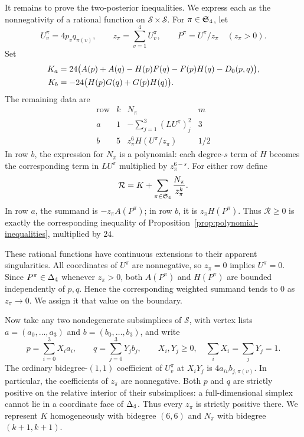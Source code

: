 It remains to prove the two-posterior inequalities. We express each
as the nonnegativity of a rational function on
$\mathcal S\times\mathcal S$. For $\pi\in\mathfrak S_4$, let
\[
 U^\pi_v=4p_vq_{\pi(v)},\qquad
 z_\pi=\sum_{v=1}^4U^\pi_v,\qquad
 P^\pi=U^\pi/z_\pi\quad(z_\pi>0).
\]
Set
\begin{align}
 K_a&=24\bigl(A(p)+A(q)-H(p)F(q)-F(p)H(q)-D_0(p,q)\bigr),\notag\\
 K_b&=-24\bigl(H(p)G(q)+G(p)H(q)\bigr).
 \label{eq:rational-K}
\end{align}
The remaining data are
\begin{equation}
 \begin{array}{c|c|c|c}
  \text{row} & k & N_\pi & m\\ \hline
  a & 1 & -\displaystyle\sum_{j=1}^3(LU^\pi)_j^2 & 3\\[2mm]
  b & 5 & z_\pi^6H(U^\pi/z_\pi) & 1/2
 \end{array}
 \label{eq:rational-rows}
\end{equation}
In row $b$, the expression for $N_\pi$ is a polynomial: each
degree-$s$ term of $H$ becomes the corresponding term in $LU^\pi$
multiplied by $z_\pi^{6-s}$. For either row define
\begin{equation}
 \mathcal R=K+\sum_{\pi\in\mathfrak S_4}\frac{N_\pi}{z_\pi^k}.
 \label{eq:rational-target}
\end{equation}
In row $a$, the summand is $-z_\pi A(P^\pi)$; in row $b$, it is
$z_\pi H(P^\pi)$. Thus $\mathcal R\ge0$ is exactly the corresponding
inequality of Proposition~\ref{prop:polynomial-inequalities}, multiplied
by $24$.

These rational functions have continuous extensions to their apparent
singularities. All coordinates of $U^\pi$ are nonnegative, so
$z_\pi=0$ implies $U^\pi=0$. Since $P^\pi\in\Delta_4$ whenever
$z_\pi>0$, both $A(P^\pi)$ and $H(P^\pi)$ are bounded independently
of $p,q$. Hence the corresponding weighted summand tends to $0$ as
$z_\pi\to0$. We assign it that value on the boundary.

Now take any two nondegenerate subsimplices of $\mathcal S$, with
vertex lists $a=(a_0,\ldots,a_3)$ and $b=(b_0,\ldots,b_3)$, and write
\[
 p=\sum_{i=0}^3X_ia_i,\qquad q=\sum_{j=0}^3Y_jb_j,
 \qquad X_i,Y_j\ge0,\quad \sum_iX_i=\sum_jY_j=1.
\]
The ordinary bidegree-$(1,1)$ coefficient of $U^\pi_v$ at $X_iY_j$
is $4a_{iv}b_{j,\pi(v)}$. In particular, the coefficients of $z_\pi$
are nonnegative. Both $p$ and $q$ are strictly positive on the
relative interior of their subsimplices: a full-dimensional simplex
cannot lie in a coordinate face of $\Delta_4$. Thus every $z_\pi$
is strictly positive there. We represent $K$ homogeneously with
bidegree $(6,6)$ and $N_\pi$ with bidegree $(k+1,k+1)$.

